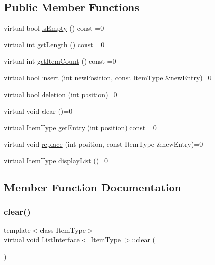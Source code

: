 \subsection*{Public Member Functions}
\begin{DoxyCompactItemize}
\item 
virtual bool \hyperlink{classListInterface_a924f91e7f81d7dcd3fda79bbcc671394}{is\+Empty} () const =0
\item 
virtual int \hyperlink{classListInterface_afc85695d4137f1e29ff02e179c9f3221}{get\+Length} () const =0
\item 
virtual int \hyperlink{classListInterface_a3e085e6ea9c5dc3e8007010cd889159c}{get\+Item\+Count} () const =0
\item 
virtual bool \hyperlink{classListInterface_a5b2f86954a86172699a3495982c38e77}{insert} (int new\+Position, const Item\+Type \&new\+Entry)=0
\item 
virtual bool \hyperlink{classListInterface_a68520ce2942ec716c745b1137c50a3c6}{deletion} (int position)=0
\item 
virtual void \hyperlink{classListInterface_adfda414908b645bdf19bcab8269168b7}{clear} ()=0
\item 
virtual Item\+Type \hyperlink{classListInterface_a86987f69e5056d287212ede41db1956a}{get\+Entry} (int position) const =0
\item 
virtual void \hyperlink{classListInterface_aae877a56b7b9f5f526c37a00e234fad1}{replace} (int position, const Item\+Type \&new\+Entry)=0
\item 
virtual Item\+Type \hyperlink{classListInterface_a2f2f533e962dd89111ee50b972dc28e7}{display\+List} ()=0
\end{DoxyCompactItemize}


\subsection{Member Function Documentation}
\mbox{\label{classListInterface_adfda414908b645bdf19bcab8269168b7}} 
\subsubsection{\texorpdfstring{clear()}{clear()}}
{\footnotesize\ttfamily template$<$class Item\+Type$>$ \\
virtual void \hyperlink{classListInterface}{List\+Interface}$<$ Item\+Type $>$\+::clear (\begin{DoxyParamCaption}{ }\end{DoxyParamCaption})\hspace{0.3cm}{\ttfamily [pure virtual]}}


